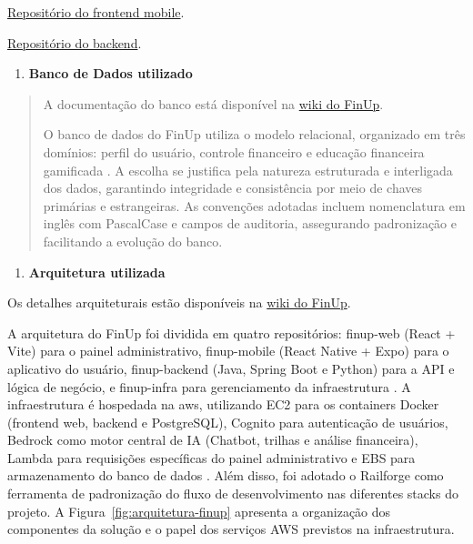 \href{https://tools.ages.pucrs.br/2026-2/6lmnp/finup/finup-mobile}{Repositório do frontend mobile}.

\href{https://tools.ages.pucrs.br/2026-2/6lmnp/finup/finup-backend}{Repositório do backend}.

\begin{enumerate}
\def\labelenumi{\arabic{enumi}.}
\setcounter{enumi}{1}
\item
  \textbf{Banco de Dados utilizado}
\end{enumerate}

\begin{quote}
A documentação do banco está disponível na
\href{https://tools.ages.pucrs.br/2026-2/6lmnp/finup/finup-wiki/-/wikis/Banco\%20de\%20Dados}{wiki do FinUp}.

O banco de dados do FinUp utiliza o modelo relacional, organizado em
três domínios: perfil do usuário, controle financeiro e educação
financeira gamificada . A escolha se justifica pela natureza estruturada
e interligada dos dados, garantindo integridade e consistência por meio
de chaves primárias e estrangeiras. As convenções adotadas incluem
nomenclatura em inglês com PascalCase e campos de auditoria, assegurando
padronização e facilitando a evolução do banco.
\end{quote}

\begin{enumerate}
\def\labelenumi{\arabic{enumi}.}
\setcounter{enumi}{2}
\item
  \textbf{Arquitetura utilizada}
\end{enumerate}

Os detalhes arquiteturais estão disponíveis na
\href{https://tools.ages.pucrs.br/2026-2/6lmnp/finup/finup-wiki/-/wikis/arquitetura}{wiki do FinUp}.

A arquitetura do FinUp foi dividida em quatro repositórios: finup-web
(React + Vite) para o painel administrativo, finup-mobile (React Native
+ Expo) para o aplicativo do usuário, finup-backend (Java, Spring Boot
e Python) para a API e lógica de negócio, e finup-infra para gerenciamento da
infraestrutura \cite{finup-wiki,react,vite,react-native,expo,java,spring-boot}.
A infraestrutura é hospedada na \ac{aws}, utilizando EC2 para os containers
Docker \cite{docker} (frontend web, backend e PostgreSQL\cite{postgresql}),
Cognito para autenticação de usuários, Bedrock como motor central de IA
(Chatbot, trilhas e análise financeira), Lambda para requisições específicas do
painel administrativo e EBS para armazenamento do banco de dados
\cite{aws-ec2,aws-cognito,aws-bedrock,aws-lambda,aws-ebs}. Além disso, foi adotado o Railforge como ferramenta de
padronização do fluxo de desenvolvimento nas diferentes stacks do
projeto. A Figura~\ref{fig:arquitetura-finup} apresenta a organização dos
componentes da solução e o papel dos serviços AWS previstos na infraestrutura.


